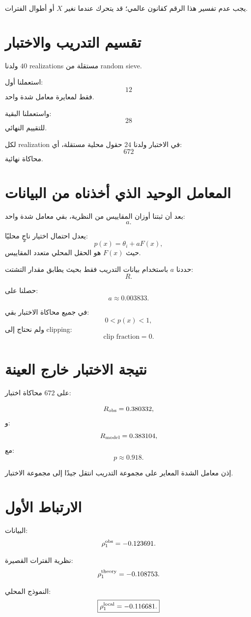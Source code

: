 \documentclass[12pt]{article}
\begin{document}
يجب عدم تفسير هذا الرقم كقانون عالمي؛ قد يتحرك عندما نغير \(X\) أو أطوال الفترات.

\section{تقسيم التدريب والاختبار}

ولدنا \(40\) realizations مستقلة من random sieve.

استعملنا أول:
\[
12
\]
فقط لمعايرة معامل شدة واحد.

واستعملنا البقية:
\[
28
\]
للتقييم النهائي.

لكل realization في الاختبار ولدنا \(24\) حقول محلية مستقلة، أي:
\[
672
\]
محاكاة نهائية.

\section{المعامل الوحيد الذي أخذناه من البيانات}

بعد أن ثبتنا أوزان المقاييس من النظرية، بقي معامل شدة واحد:
\[
a.
\]

يعدل احتمال اختيار ناجٍ محليًا:
\[
p(x)
=
\theta_i+aF(x),
\]
حيث \(F(x)\) هو الحقل المحلي متعدد المقاييس.

حددنا \(a\) باستخدام بيانات التدريب فقط بحيث يطابق مقدار التشتت:
\[
R.
\]

حصلنا على:
\[
\boxed{
a\approx0.003833.
}
\]

في جميع محاكاة الاختبار بقي:
\[
0<p(x)<1,
\]
ولم نحتاج إلى clipping:
\[
\text{clip fraction}=0.
\]

\section{نتيجة الاختبار خارج العينة}

على \(672\) محاكاة اختبار:

\[
R_{\rm obs}=0.380332,
\]
و:
\[
R_{\rm model}=0.383104,
\]
مع:
\[
p\approx0.918.
\]

إذن معامل الشدة المعاير على مجموعة التدريب انتقل جيدًا إلى مجموعة الاختبار.

\section{الارتباط الأول}

البيانات:
\[
\rho_1^{\rm obs}=-0.123691.
\]

نظرية الفترات القصيرة:
\[
\rho_1^{\rm theory}=-0.108753.
\]

النموذج المحلي:
\[
\boxed{
\rho_1^{\rm local}=-0.116681.
}
\]
\end{document}
